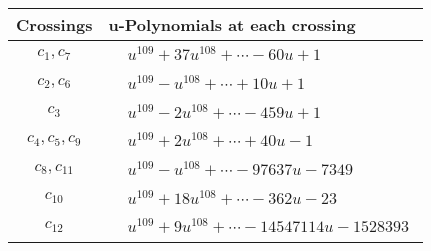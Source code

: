 \documentclass[1p]{elsarticle_modified}
\theoremstyle{definition}
\begin{document}
\begin{tabular}{m{50pt}|m{274pt}}
Crossings & \hspace{64pt}u-Polynomials at each crossing \\
\hline $$\begin{aligned}c_{1},c_{7}\end{aligned}$$&$\begin{aligned}
&u^{109}+37 u^{108}+\cdots-60 u+1
\end{aligned}$\\
\hline $$\begin{aligned}c_{2},c_{6}\end{aligned}$$&$\begin{aligned}
&u^{109}- u^{108}+\cdots+10 u+1
\end{aligned}$\\
\hline $$\begin{aligned}c_{3}\end{aligned}$$&$\begin{aligned}
&u^{109}-2 u^{108}+\cdots-459 u+1
\end{aligned}$\\
\hline $$\begin{aligned}c_{4},c_{5},c_{9}\end{aligned}$$&$\begin{aligned}
&u^{109}+2 u^{108}+\cdots+40 u-1
\end{aligned}$\\
\hline $$\begin{aligned}c_{8},c_{11}\end{aligned}$$&$\begin{aligned}
&u^{109}- u^{108}+\cdots-97637 u-7349
\end{aligned}$\\
\hline $$\begin{aligned}c_{10}\end{aligned}$$&$\begin{aligned}
&u^{109}+18 u^{108}+\cdots-362 u-23
\end{aligned}$\\
\hline $$\begin{aligned}c_{12}\end{aligned}$$&$\begin{aligned}
&u^{109}+9 u^{108}+\cdots-14547114 u-1528393
\end{aligned}$\\
\hline
\end{tabular}\\~\\
\newpage\renewcommand{\arraystretch}{1}
\end{document}
